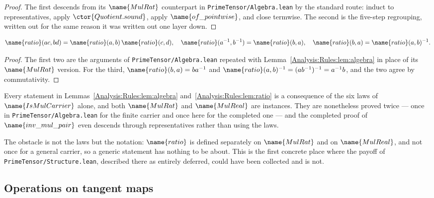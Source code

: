 \begin{proof}
The first descends from its $\name{MulRat}$ counterpart in
\texttt{PrimeTensor/Algebra.lean} by the standard route: induct to
representatives, apply $\ctor{Quotient.sound}$, apply
$\name{of\_pointwise}$, and close termwise.  The second is the five-step
regrouping, written out for the same reason it was written out one layer down.
\end{proof}

\begin{lemma}\label{Analysis:Rules:lem:ratio}
\[
  \name{ratio}(ac, bd) = \name{ratio}(a,b)\,\name{ratio}(c,d),
  \quad
  \name{ratio}(a^{-1},b^{-1}) = \name{ratio}(b,a),
  \quad
  \name{ratio}(b,a) = \name{ratio}(a,b)^{-1}.
\]
\end{lemma}

\begin{proof}
The first two are the arguments of \texttt{PrimeTensor/Algebra.lean} repeated
with Lemma~\ref{Analysis:Rules:lem:algebra} in place of its $\name{MulRat}$
version.  For the third, $\name{ratio}(b,a) = ba^{-1}$ and
$\name{ratio}(a,b)^{-1} = (ab^{-1})^{-1} = a^{-1}b$, and the two agree by
commutativity.
\end{proof}

\begin{remark}
\label{Analysis:Rules:rem:mixin}
Every statement in Lemmas~\ref{Analysis:Rules:lem:algebra}
and~\ref{Analysis:Rules:lem:ratio} is a consequence of the six laws of
$\name{IsMulCarrier}$ alone, and both $\name{MulRat}$ and $\name{MulReal}$ are
instances.  They are nonetheless proved twice --- once in
\texttt{PrimeTensor/Algebra.lean} for the finite carrier and once here for the
completed one --- and the completed proof of $\name{inv\_mul\_pair}$ even
descends through representatives rather than using the laws.

The obstacle is not the laws but the notation: $\name{ratio}$ is defined
separately on $\name{MulRat}$ and on $\name{MulReal}$, and not once for a
general carrier, so a generic statement has nothing to be about.  This is the
first concrete place where the payoff of
\texttt{PrimeTensor/Structure.lean}, described there as entirely deferred,
could have been collected and is not.
\end{remark}

\subsection{Operations on tangent maps}

